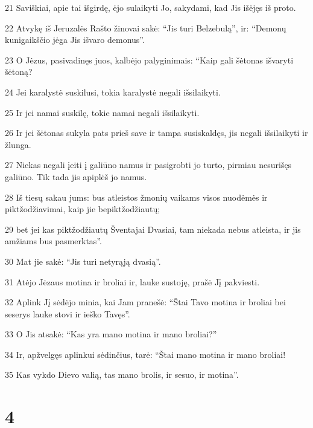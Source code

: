 \par 21 Saviškiai, apie tai išgirdę, ėjo sulaikyti Jo, sakydami, kad Jis išėjęs iš proto. 
\par 22 Atvykę iš Jeruzalės Rašto žinovai sakė: “Jis turi Belzebulą”, ir: “Demonų kunigaikščio jėga Jis išvaro demonus”. 
\par 23 O Jėzus, pasivadinęs juos, kalbėjo palyginimais: “Kaip gali šėtonas išvaryti šėtoną? 
\par 24 Jei karalystė suskilusi, tokia karalystė negali išsilaikyti. 
\par 25 Ir jei namai suskilę, tokie namai negali išsilaikyti. 
\par 26 Ir jei šėtonas sukyla pats prieš save ir tampa susiskaldęs, jis negali išsilaikyti ir žlunga. 
\par 27 Niekas negali įeiti į galiūno namus ir pasigrobti jo turto, pirmiau nesurišęs galiūno. Tik tada jis apiplėš jo namus. 
\par 28 Iš tiesų sakau jums: bus atleistos žmonių vaikams visos nuodėmės ir piktžodžiavimai, kaip jie bepiktžodžiautų; 
\par 29 bet jei kas piktžodžiautų Šventajai Dvasiai, tam niekada nebus atleista, ir jis amžiams bus pasmerktas”. 
\par 30 Mat jie sakė: “Jis turi netyrąją dvasią”. 
\par 31 Atėjo Jėzaus motina ir broliai ir, lauke sustoję, prašė Jį pakviesti. 
\par 32 Aplink Jį sėdėjo minia, kai Jam pranešė: “Štai Tavo motina ir broliai bei seserys lauke stovi ir ieško Tavęs”. 
\par 33 O Jis atsakė: “Kas yra mano motina ir mano broliai?” 
\par 34 Ir, apžvelgęs aplinkui sėdinčius, tarė: “Štai mano motina ir mano broliai! 
\par 35 Kas vykdo Dievo valią, tas mano brolis, ir sesuo, ir motina”.



\chapter{4}


